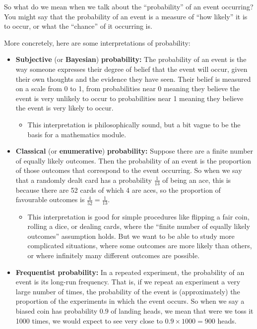 \documentclass[
  a4paper,
]{book}
\providecommand{\tightlist}{%
  \setlength{\itemsep}{0pt}\setlength{\parskip}{0pt}}
\theoremstyle{definition}
\theoremstyle{definition}
\theoremstyle{definition}
\theoremstyle{remark}
\begin{document}
So what do we mean when we talk about the ``probability'' of an event occurring? You might say that the probability of an event is a measure of ``how likely'' it is to occur, or what the ``chance'' of it occurring is.

More concretely, here are some interpretations of probability:

\begin{itemize}
\tightlist
\item
  \textbf{Subjective} (or \textbf{Bayesian}) \textbf{probability:} The probability of an event is the way someone expresses their degree of belief that the event will occur, given their own thoughts and the evidence they have seen. Their belief is measured on a scale from 0 to 1, from probabilities near 0 meaning they believe the event is very unlikely to occur to probabilities near 1 meaning they believe the event is very likely to occur.

  \begin{itemize}
  \tightlist
  \item
    This interpretation is philosophically sound, but a bit vague to be the basis for a mathematics module.
  \end{itemize}
\item
  \textbf{Classical} (or \textbf{enumerative}) \textbf{probability:} Suppose there are a finite number of equally likely outcomes. Then the probability of an event is the proportion of those outcomes that correspond to the event occurring. So when we say that a randomly dealt card has a probability \(\frac{1}{13}\) of being an ace, this is because there are 52 cards of which 4 are aces, so the proportion of favourable outcomes is \(\frac{4}{52} = \frac{1}{13}\).

  \begin{itemize}
  \tightlist
  \item
    This interpretation is good for simple procedures like flipping a fair coin, rolling a dice, or dealing cards, where the ``finite number of equally likely outcomes'' assumption holds. But we want to be able to study more complicated situations, where some outcomes are more likely than others, or where infinitely many different outcomes are possible.
  \end{itemize}
\item
  \textbf{Frequentist probability:} In a repeated experiment, the probability of an event is its long-run frequency. That is, if we repeat an experiment a very large number of times, the probability of the event is (approximately) the proportion of the experiments in which the event occurs. So when we say a biased coin has probability 0.9 of landing heads, we mean that were we toss it 1000 times, we would expect to see very close to \(0.9 \times 1000 = 900\) heads.


\end{itemize}
\end{document}
